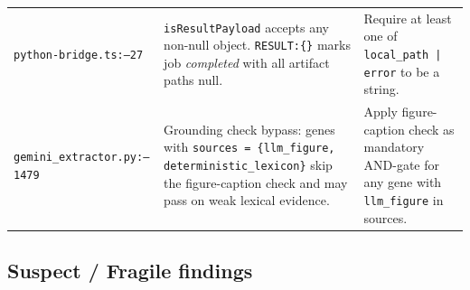 \documentclass[11pt,a4paper]{article}
\begin{document}
\begin{longtable}{p{}p{}p{}}
\rowcolor{LightRed}
\texttt{python-bridge.ts:\linebreak 25--27} &
  \texttt{isResultPayload} accepts any non-null object. \texttt{RESULT:\{\}} marks job \textit{completed} with all artifact paths null. &
  Require at least one of \texttt{local\_path | error} to be a string. \\

\rowcolor{LightRed}
\texttt{gemini\_extractor.py:\linebreak 1455--1479} &
  Grounding check bypass: genes with \texttt{sources = \{llm\_figure, deterministic\_lexicon\}}
  skip the figure-caption check and may pass on weak lexical evidence. &
  Apply figure-caption check as mandatory AND-gate for any gene with \texttt{llm\_figure} in sources. \\

\end{longtable}

\subsection{Suspect / Fragile findings}
\end{document}
